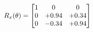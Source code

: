 \documentclass[preview]{standalone}
\begin{document}
\begin{align*}
\special{dvisvgm:raw <g id='unique000'>}R_{x}(\theta) = \begin{bmatrix}1 & 0 & 0 \\0 & +0.94 & +0.34 \\0 & -0.34 & +0.94\end{bmatrix}\special{dvisvgm:raw </g>}
\end{align*}
\end{document}
